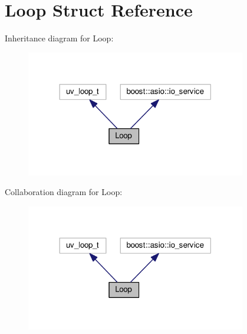 \hypertarget{struct_loop}{}\section{Loop Struct Reference}
\label{struct_loop}


Inheritance diagram for Loop\+:
\nopagebreak
\begin{figure}[H]
\begin{center}
\leavevmode
\includegraphics[width=272pt]{struct_loop__inherit__graph}
\end{center}
\end{figure}


Collaboration diagram for Loop\+:
\nopagebreak
\begin{figure}[H]
\begin{center}
\leavevmode
\includegraphics[width=272pt]{struct_loop__coll__graph}
\end{center}
\end{figure}

